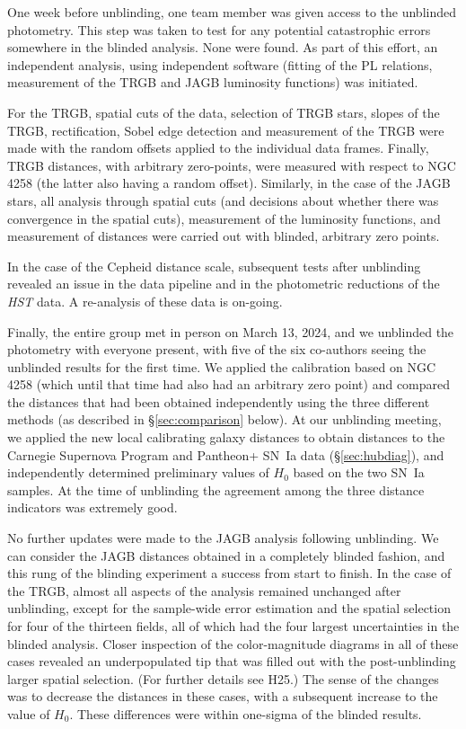 \documentclass[12pt,modern]{aastex631}
\newcommand{\ho}{$H_{0}$\xspace}
\newcommand{\hst}{\emph{HST}\xspace}
\newcommand{\sn}{SN~Ia\xspace}
\newcommand{\ngc}{NGC\,\xspace}
\begin{document}
One week before unblinding, one team member was given access to the unblinded photometry. This step was taken to test for any potential catastrophic errors somewhere in the blinded analysis. None were found. As part of this effort, an independent analysis, using independent software (fitting of the PL relations, measurement of the TRGB and JAGB luminosity functions) was initiated. 

For the TRGB, spatial cuts of the data, selection of TRGB stars, slopes of the TRGB, rectification, Sobel edge detection and measurement of the TRGB were made with the random offsets applied to the individual data frames. Finally, TRGB  distances, with arbitrary zero-points, were measured with respect to \ngc 4258 (the latter also having a random offset). Similarly, in the case of the JAGB stars, all analysis through spatial cuts (and decisions about whether there was convergence in the spatial cuts),  measurement of the luminosity functions, and measurement of distances were carried out with blinded, arbitrary zero points. 


In the case of the Cepheid distance scale, subsequent tests after unblinding revealed an issue in the data pipeline and in the photometric reductions of the \hst data. A re-analysis of these data is on-going. 

Finally, the entire group met in person on March 13, 2024, and we unblinded the photometry with everyone present, with five of the six co-authors seeing the unblinded results for the first time. We applied the calibration based on \ngc 4258 (which until that time had also had an arbitrary zero point) and compared the distances that had been obtained independently using the three different methods (as described in \S \ref{sec:comparison} below).  At our unblinding meeting, we applied the new local calibrating galaxy distances to obtain distances to the Carnegie Supernova Program and Pantheon+ \sn data (\S \ref{sec:hubdiag}), and independently determined preliminary values of \ho based on the two \sn samples.  At the time of unblinding the agreement among the three distance indicators was extremely good. 
   

No further updates were made to the JAGB analysis following unblinding. We can consider the JAGB distances obtained in a completely blinded fashion, and this rung of the blinding experiment a success from start to finish. In the case of the TRGB, almost all aspects of the analysis remained unchanged after unblinding, except for the sample-wide error estimation and the spatial selection for four of the thirteen fields, all of which had the four largest uncertainties in the blinded analysis. Closer inspection of the color-magnitude diagrams in all of these cases revealed an underpopulated tip that was filled out with the post-unblinding larger spatial selection.  (For further details see H25.) The sense of the changes was to decrease the distances in these cases, with a subsequent increase to the value of \ho. These differences were within one-sigma of the blinded results. 
\end{document}

